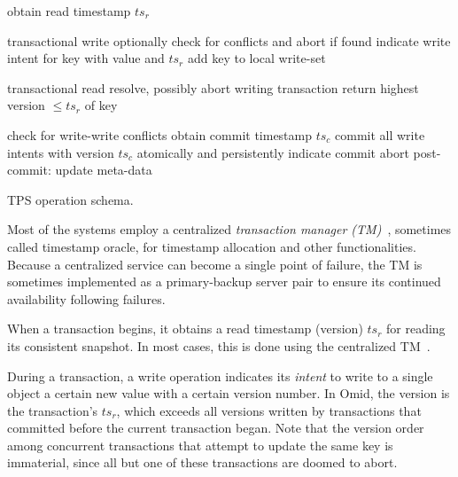 \begin{algorithm}[tb]
\begin{algorithmic}[1]
\small
{}
\State obtain read timestamp $ts_r$ 
\EndProcedure

 \Comment transactional write
\State optionally check for conflicts and abort if found 
\State indicate write intent for key with value and $ts_r$
\State add key to local write-set
\EndProcedure

 \Comment transactional read
	\State resolve, possibly abort writing transaction \label{l:resolve}
\EndIf
\State return highest version   $\le ts_r$ of key
\EndProcedure


\Statex \Comment check for write-write conflicts  \label{l:validate}
	\State obtain commit timestamp $ts_c$
	\Statex \Comment commit all write intents with version $ts_c$
	\State atomically and persistently indicate commit   \label{l:commit}
\Else
	\State abort	
\EndIf
\State post-commit: update meta-data
\EndProcedure

\end{algorithmic}
\caption{TPS operation schema.} 
\label{alg:schema}
\end{algorithm} 

Most of the systems employ a centralized \emph{transaction manager (TM)}~\cite{Percolator2010,OmidICDE2014,Omid2017,tephra},
 sometimes called timestamp oracle, for timestamp allocation and other functionalities. 
 Because a centralized service can become a single point of failure, the TM is sometimes implemented
 as a primary-backup server pair to ensure its continued availability following failures.

  When a transaction begins, it obtains a read timestamp (version) $ts_r$ for reading its consistent snapshot.
 In most cases, this is done using the centralized TM~\cite{Percolator2010,OmidICDE2014,Omid2017,tephra}. 

 During a transaction, a write operation indicates its \emph{intent} to write to a single object a certain new value with a certain version number.
In Omid, the version is the transaction's $ts_r$, which exceeds all versions written by transactions that committed before the
current transaction began. Note that the version order among concurrent transactions that  attempt to update the same key is immaterial, 
since all but one of these transactions are doomed to abort. 

